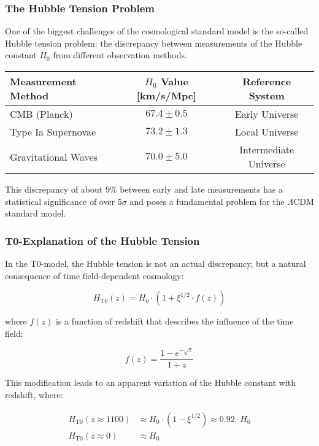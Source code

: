 \documentclass[12pt,a4paper]{article}
\theoremstyle{definition}
\begin{document}
	\subsubsection{The Hubble Tension Problem}
	
	One of the biggest challenges of the cosmological standard model is the so-called Hubble tension problem: the discrepancy between measurements of the Hubble constant $H_0$ from different observation methods.
	
	\begin{center}
		\begin{tabular}{|l|c|c|}
			\hline
			\textbf{Measurement Method} & \textbf{$H_0$ Value [km/s/Mpc]} & \textbf{Reference System} \\
			\hline
			CMB (Planck) & $67.4 \pm 0.5$ & Early Universe \\
			\hline
			Type Ia Supernovae & $73.2 \pm 1.3$ & Local Universe \\
			\hline
			Gravitational Waves & $70.0 \pm 5.0$ & Intermediate Universe \\
			\hline
		\end{tabular}
	\end{center}
	
	This discrepancy of about 9\% between early and late measurements has a statistical significance of over $5\sigma$ and poses a fundamental problem for the $\Lambda$CDM standard model.
	
	\subsubsection{T0-Explanation of the Hubble Tension}
	
	In the T0-model, the Hubble tension is not an actual discrepancy, but a natural consequence of time field-dependent cosmology:
	
	\begin{equation}
		H_{\text{T0}}(z) = H_0 \cdot \left(1 + \xi^{1/2} \cdot f(z)\right)
	\end{equation}
	
	where $f(z)$ is a function of redshift that describes the influence of the time field:
	
	\begin{equation}
		f(z) = \frac{1 - e^{-\sqrt{z}}}{1 + z}
	\end{equation}
	
	This modification leads to an apparent variation of the Hubble constant with redshift, where:
	
	\begin{align}
		H_{\text{T0}}(z \approx 1100) &\approx H_0 \cdot (1 - \xi^{1/2}) \approx 0.92 \cdot H_0 \\
		H_{\text{T0}}(z \approx 0) &\approx H_0
	\end{align}
	
\end{document}
